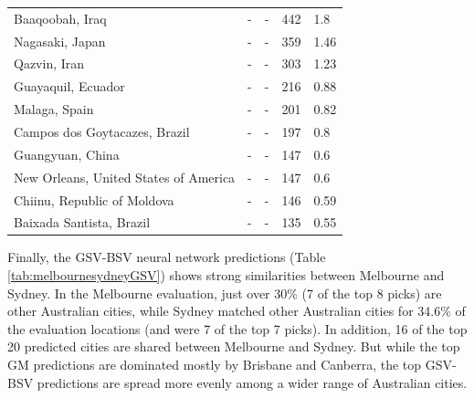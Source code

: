 \documentclass[10pt,letterpaper,hidelinks]{article}
\begin{document}
\begin{table}[!htbp]
\begin{adjustwidth}{-2.25in}{0in}
\begin{tabular}{ l  l l l  l}
Baaqoobah, Iraq &-&- & 442 & 1.8\\ 
Nagasaki, Japan &-&- & 359 & 1.46\\ 
Qazvin, Iran &-&- & 303 & 1.23\\ 
Guayaquil, Ecuador &-&- & 216 & 0.88\\ 
Malaga, Spain &-&- & 201 & 0.82\\ 
Campos dos Goytacazes, Brazil &-&- & 197 & 0.8\\ 
Guangyuan, China &-&- & 147 & 0.6\\ 
New Orleans, United States of America &-&- & 147 & 0.6\\ 
Chiinu, Republic of Moldova &-&- & 146 & 0.59\\ 
Baixada Santista, Brazil &-&- & 135 & 0.55\\ \hline
\end{tabular}
\end{adjustwidth}
\end{table}


Finally, the GSV-BSV neural network predictions (Table \ref{tab:melbournesydneyGSV}) shows strong similarities between Melbourne and Sydney. In the Melbourne evaluation, just over 30\% (7 of the top 8 picks) are other Australian cities, while Sydney matched other Australian cities for 34.6\% of the evaluation locations (and were 7 of the top 7 picks). In addition, 16 of the top 20 predicted cities are shared between Melbourne and Sydney. But while the top GM predictions are dominated mostly by Brisbane and Canberra, the top GSV-BSV predictions are spread more evenly among a wider range of Australian cities.
\end{document}
